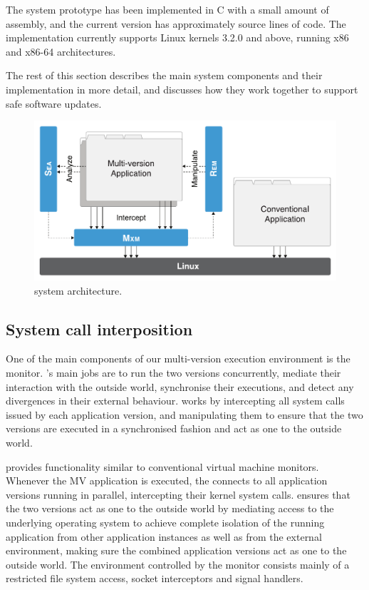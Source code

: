 The system prototype has been implemented in C with a small amount of
assembly, and the current version has approximately \mxSLOC source
lines of code. The implementation currently supports Linux kernels
3.2.0 and above, running x86 and x86-64 architectures.

The rest of this section describes the main \mx system components and
their implementation in more detail, and discusses how they work
together to support safe software updates.

\begin{figure}[t!]
\begin{center}
\includegraphics[width=0.75\columnwidth]{safe-updates/figures/architecture}
\caption{\mx system architecture.  
}
\label{fig:design}
\end{center}
\end{figure}


\subsection{System call interposition}
\label{sec:mxm}

One of the main components of our multi-version execution environment
is the \mxm monitor.  \mxm's main jobs are to run the two versions
concurrently, mediate their interaction with the outside world,
synchronise their executions, and detect any divergences in their
external behaviour. \mxm works by intercepting all system calls issued
by each application version, and manipulating them to ensure that the
two versions are executed in a synchronised fashion and act as one to
the outside world.

\mxm provides functionality similar to conventional virtual machine
monitors.  Whenever the MV application is executed, the \mxm connects
to all application versions running in parallel, intercepting their
kernel system calls.  \mxm ensures that the two versions act as one to
the outside world by mediating access to the underlying operating
system to achieve complete isolation of the running application from
other application instances as well as from the external environment,
making sure the combined application versions act as one to the
outside world.  The environment controlled by the monitor consists
mainly of a restricted file system access, socket interceptors and
signal handlers.

